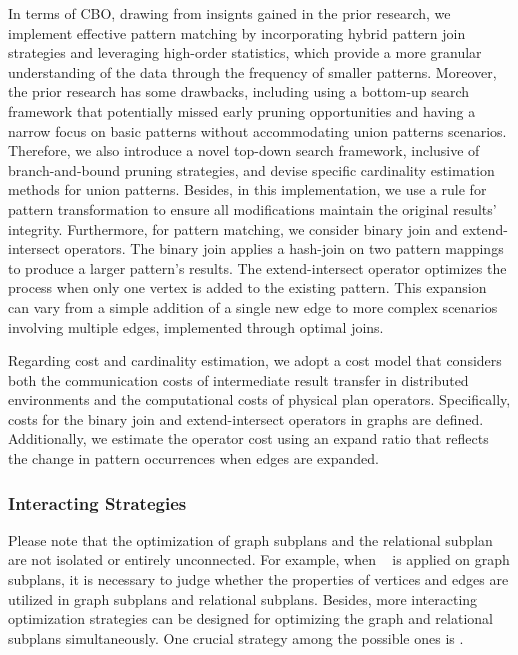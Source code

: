 In terms of CBO, drawing from insignts gained in the prior research, we implement effective pattern matching by incorporating hybrid pattern join strategies and leveraging high-order statistics, which provide a more granular understanding of the data through the frequency of smaller patterns.
Moreover, the prior research has some drawbacks, including using a bottom-up search framework that potentially missed early pruning opportunities and having a narrow focus on basic patterns without accommodating union patterns scenarios.
Therefore, we also introduce a novel top-down search framework, inclusive of branch-and-bound pruning strategies, and devise specific cardinality estimation methods for union patterns. 
Besides, in this implementation, we use a rule for pattern transformation to ensure all modifications maintain the original results’ integrity.
Furthermore, for pattern matching, we consider binary join and extend-intersect operators. 
The binary join applies a hash-join on two pattern mappings to produce a larger pattern's results.
The extend-intersect operator optimizes the process when only one vertex is added to the existing pattern. 
This expansion can vary from a simple addition of a single new edge to more complex scenarios involving multiple edges, implemented through optimal joins.

Regarding cost and cardinality estimation, we adopt a cost model that considers both the communication costs of intermediate result transfer in distributed environments and the computational costs of physical plan operators. 
Specifically, costs for the binary join and extend-intersect operators in graphs are defined. 
Additionally, we estimate the operator cost using an expand ratio that reflects the change in pattern occurrences when edges are expanded.

\subsubsection{Interacting Strategies}

Please note that the optimization of graph subplans and the relational subplan are not isolated or entirely unconnected.
For example, when \trimrule~ is applied on graph subplans, it is necessary to judge whether the properties of vertices and edges are utilized in graph subplans and relational subplans.
Besides, more interacting optimization strategies can be designed for optimizing the graph and relational subplans simultaneously.
One crucial strategy among the possible ones is \filterrule. 

